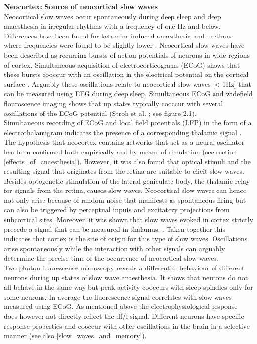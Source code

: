 \textbf{Neocortex: Source of neocortical slow waves}\\
Neocortical slow waves occur spontaneously during deep sleep and deep anaesthesia in irregular rhythms with a frequency of one Hz and below. Differences have been found for ketamine induced anaesthesia and urethane where frequencies were found to be slightly lower \parencite{steriade1993novel}. Neocortical slow waves have been described as recurring bursts of action potentials of neurons in wide regions of cortex. Simultaneous acquisition of electrocorticograms (ECoG) shows that these bursts cooccur with an oscillation in the electrical potential on the cortical surface \parencite{steriade1993novel}. Arguably these oscillations relate to neocortical slow waves [< 1Hz] that can be measured using EEG during deep sleep. Simultaneous ECoG and widefield flouroscence imaging shows that up states typically cooccur with several oscillations of the ECoG potential (Stroh et al. \cite*{stroh2013making}; see figure 2.1). \\
Simultaneous recording of ECoG and local field potentials (LFP) in the form of a electrothalamigram indicates the presence of a corresponding thalamic signal \parencite{steriade1993novel}. The hypothesis that neocortex contains networks that act as a neural oscillator has been confirmed both empirically and by means of simulation (see section \ref{effects_of_anaesthesia}). However, it was also found that optical stimuli and the resulting signal that originates from the retina are suitable to elicit slow waves. Besides optogenetic stimulation of the lateral geniculate body, the thalamic relay for signals from the retina, causes slow waves. Neocortical slow waves can hence not only arise because of random noise that manifests as spontaneous firing but can also be triggered by perceptual inputs and excitatory projections from subcortical sites. Moreover, it was shown that slow waves evoked in cortex strictly precede a signal that can be measured in thalamus. \parencite{stroh2013making}. Taken together this indicates that cortex is the site of origin for this type of slow waves. Oscillations arise spontaneously while the interaction with other signals can arguably determine the precise time of the occurrence of neocortical slow waves.\\
Two photon fluorescence microscopy reveals a differential behaviour of different neurons during up states of slow wave anaesthesia. It shows that neurons do not all behave in the same way but peak activity cooccurs with sleep spindles only for some neurons. In average the fluorescence signal correlates with slow waves measured using ECoG. As mentioned above the electrophysiological response does however not directly reflect the df/f signal. Different neurons have specific response properties and cooccur with other oscillations in the brain in a selective manner (see also \ref{slow_waves_and_memory}).\\

